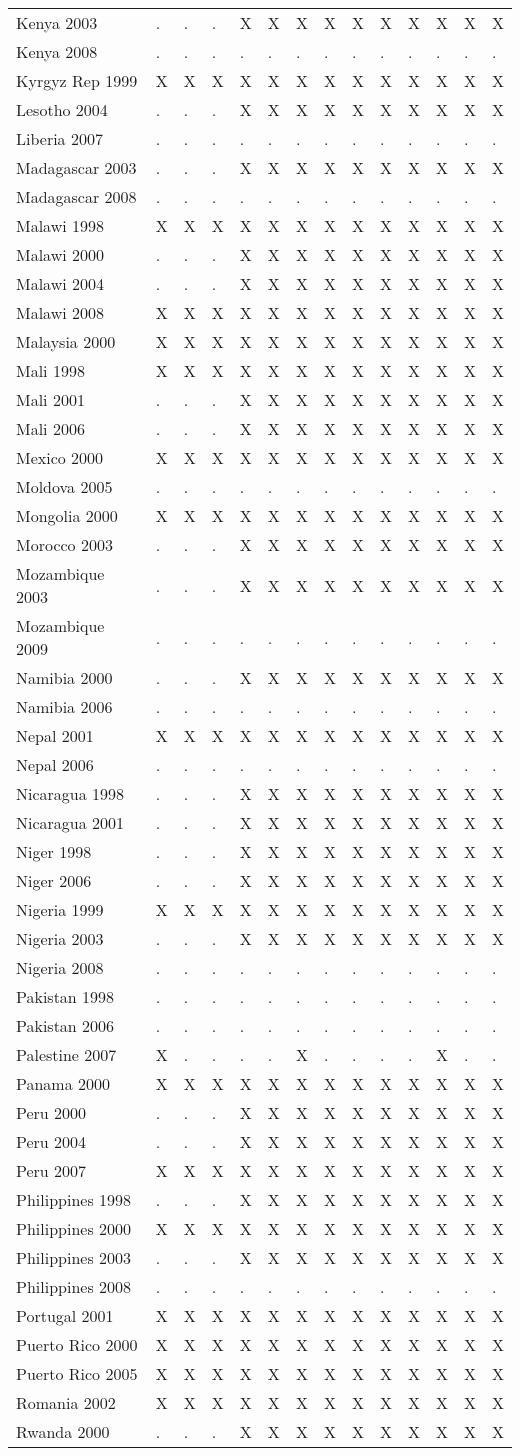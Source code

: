 \documentclass[a4paper]{article}
\begin{document}
\begin{longtable}{llllllllllllll}
Kenya 2003&.&.&.&X&X&X&X&X&X&X&X&X&X\tabularnewline
\newpage
Kenya 2008&.&.&.&.&.&.&.&.&.&.&.&.&.\tabularnewline
Kyrgyz Rep 1999&X&X&X&X&X&X&X&X&X&X&X&X&X\tabularnewline
Lesotho 2004&.&.&.&X&X&X&X&X&X&X&X&X&X\tabularnewline
Liberia 2007&.&.&.&.&.&.&.&.&.&.&.&.&.\tabularnewline
Madagascar 2003&.&.&.&X&X&X&X&X&X&X&X&X&X\tabularnewline
Madagascar 2008&.&.&.&.&.&.&.&.&.&.&.&.&.\tabularnewline
Malawi 1998&X&X&X&X&X&X&X&X&X&X&X&X&X\tabularnewline
Malawi 2000&.&.&.&X&X&X&X&X&X&X&X&X&X\tabularnewline
Malawi 2004&.&.&.&X&X&X&X&X&X&X&X&X&X\tabularnewline
Malawi 2008&X&X&X&X&X&X&X&X&X&X&X&X&X\tabularnewline
Malaysia 2000&X&X&X&X&X&X&X&X&X&X&X&X&X\tabularnewline
Mali 1998&X&X&X&X&X&X&X&X&X&X&X&X&X\tabularnewline
Mali 2001&.&.&.&X&X&X&X&X&X&X&X&X&X\tabularnewline
Mali 2006&.&.&.&X&X&X&X&X&X&X&X&X&X\tabularnewline
Mexico 2000&X&X&X&X&X&X&X&X&X&X&X&X&X\tabularnewline
Moldova 2005&.&.&.&.&.&.&.&.&.&.&.&.&.\tabularnewline
Mongolia 2000&X&X&X&X&X&X&X&X&X&X&X&X&X\tabularnewline
Morocco 2003&.&.&.&X&X&X&X&X&X&X&X&X&X\tabularnewline
Mozambique 2003&.&.&.&X&X&X&X&X&X&X&X&X&X\tabularnewline
Mozambique 2009&.&.&.&.&.&.&.&.&.&.&.&.&.\tabularnewline
Namibia 2000&.&.&.&X&X&X&X&X&X&X&X&X&X\tabularnewline
Namibia 2006&.&.&.&.&.&.&.&.&.&.&.&.&.\tabularnewline
Nepal 2001&X&X&X&X&X&X&X&X&X&X&X&X&X\tabularnewline
Nepal 2006&.&.&.&.&.&.&.&.&.&.&.&.&.\tabularnewline
Nicaragua 1998&.&.&.&X&X&X&X&X&X&X&X&X&X\tabularnewline
Nicaragua 2001&.&.&.&X&X&X&X&X&X&X&X&X&X\tabularnewline
Niger 1998&.&.&.&X&X&X&X&X&X&X&X&X&X\tabularnewline
Niger 2006&.&.&.&X&X&X&X&X&X&X&X&X&X\tabularnewline
Nigeria 1999&X&X&X&X&X&X&X&X&X&X&X&X&X\tabularnewline
Nigeria 2003&.&.&.&X&X&X&X&X&X&X&X&X&X\tabularnewline
Nigeria 2008&.&.&.&.&.&.&.&.&.&.&.&.&.\tabularnewline
Pakistan 1998&.&.&.&.&.&.&.&.&.&.&.&.&.\tabularnewline
Pakistan 2006&.&.&.&.&.&.&.&.&.&.&.&.&.\tabularnewline
Palestine 2007&X&.&.&.&.&X&.&.&.&.&X&.&.\tabularnewline
Panama 2000&X&X&X&X&X&X&X&X&X&X&X&X&X\tabularnewline
Peru 2000&.&.&.&X&X&X&X&X&X&X&X&X&X\tabularnewline
Peru 2004&.&.&.&X&X&X&X&X&X&X&X&X&X\tabularnewline
Peru 2007&X&X&X&X&X&X&X&X&X&X&X&X&X\tabularnewline
Philippines 1998&.&.&.&X&X&X&X&X&X&X&X&X&X\tabularnewline
Philippines 2000&X&X&X&X&X&X&X&X&X&X&X&X&X\tabularnewline
\newpage
Philippines 2003&.&.&.&X&X&X&X&X&X&X&X&X&X\tabularnewline
Philippines 2008&.&.&.&.&.&.&.&.&.&.&.&.&.\tabularnewline
Portugal 2001&X&X&X&X&X&X&X&X&X&X&X&X&X\tabularnewline
Puerto Rico 2000&X&X&X&X&X&X&X&X&X&X&X&X&X\tabularnewline
Puerto Rico 2005&X&X&X&X&X&X&X&X&X&X&X&X&X\tabularnewline
Romania 2002&X&X&X&X&X&X&X&X&X&X&X&X&X\tabularnewline
Rwanda 2000&.&.&.&X&X&X&X&X&X&X&X&X&X\tabularnewline

\end{longtable}
\end{document}

